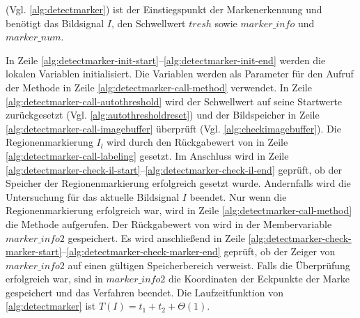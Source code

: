  (Vgl. \autoref{alg:detectmarker}) ist der Einstiegspunkt der Markenerkennung und benötigt das
 Bildsignal $I$, den Schwellwert $\mathit{tresh}$ sowie $\mathit{marker\_info}$ und $\mathit{marker\_num}$.

In Zeile \ref{alg:detectmarker-init-start}--\ref{alg:detectmarker-init-end} werden die lokalen Variablen initialisiert.
 Die Variablen werden als Parameter für den Aufruf der Methode  in Zeile
 \ref{alg:detectmarker-call-method} verwendet. In Zeile \ref{alg:detectmarker-call-autothreshold} wird der Schwellwert
 auf seine Startwerte zurückgesetzt (Vgl. \autoref{alg:autothresholdreset}) und der Bildspeicher in Zeile
 \ref{alg:detectmarker-call-imagebuffer} überprüft (Vgl. \autoref{alg:checkimagebuffer}). Die Regionenmarkierung $I_l$
 wird durch den Rückgabewert von  in Zeile \ref{alg:detectmarker-call-labeling} gesetzt. Im
 Anschluss wird in Zeile \ref{alg:detectmarker-check-il-start}--\ref{alg:detectmarker-check-il-end} geprüft, ob der
 Speicher der Regionenmarkierung erfolgreich gesetzt wurde. Andernfalls wird die Untersuchung für das aktuelle
 Bildsignal $I$ beendet. Nur wenn die Regionenmarkierung erfolgreich war, wird in Zeile
 \ref{alg:detectmarker-call-method} die Methode  aufgerufen. Der Rückgabewert von
  wird in der Membervariable $\mathit{marker\_info2}$ gespeichert. Es wird anschließend in
 Zeile \ref{alg:detectmarker-check-marker-start}--\ref{alg:detectmarker-check-marker-end} geprüft, ob der Zeiger von
 $\mathit{marker\_info2}$ auf einen gültigen Speicherbereich verweist. Falls die Überprüfung erfolgreich war, sind in
 $\mathit{marker\_info2}$ die Koordinaten der Eckpunkte der Marke gespeichert und das Verfahren beendet.
 Die Laufzeitfunktion von \autoref{alg:detectmarker} ist $T(I) = t_{1} + t_{2} + \Theta(1)$.





